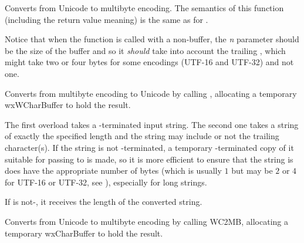 \label{wxmbconvwc2mb}



Converts from Unicode to multibyte encoding. The semantics of this function
(including the return value meaning) is the same as for 
.

Notice that when the function is called with a non-\NULL buffer, the 
{\it n} parameter should be the size of the buffer and so it \emph{should} take
into account the trailing \NUL, which might take two or four bytes for some
encodings (UTF-16 and UTF-32) and not one.


\label{wxmbconvcmb2wc}



Converts from multibyte encoding to Unicode by calling 
, allocating a temporary wxWCharBuffer to hold
the result.

The first overload takes a \NUL-terminated input string. The second one takes a
string of exactly the specified length and the string may include or not the
trailing \NUL character(s). If the string is not \NUL-terminated, a temporary 
\NUL-terminated copy of it suitable for passing to  
is made, so it is more efficient to ensure that the string is does have the
appropriate number of \NUL bytes (which is usually $1$ but may be $2$ or $4$
for UTF-16 or UTF-32, see ),
especially for long strings.

If  is not-\NULL, it receives the length of the converted
string.


\label{wxmbconvcwc2mb}



Converts from Unicode to multibyte encoding by calling WC2MB,
allocating a temporary wxCharBuffer to hold the result.

